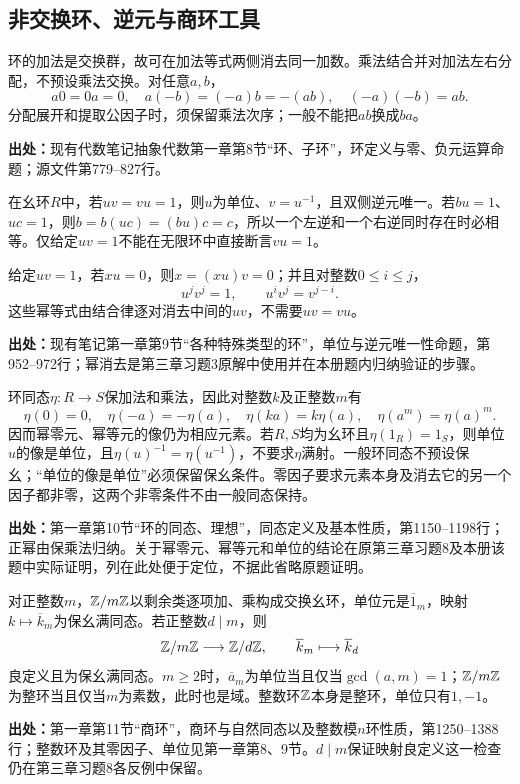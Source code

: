 \subsection{非交换环、逆元与商环工具}

\begin{reviewprop}\label{tool:r-ring-laws}
环的加法是交换群，故可在加法等式两侧消去同一加数。乘法结合并对加法左右分配，不预设乘法交换。对任意$a,b$，
\[
a0=0a=0,\quad a(-b)=(-a)b=-(ab),\quad(-a)(-b)=ab.
\]
分配展开和提取公因子时，须保留乘法次序；一般不能把$ab$换成$ba$。

\textbf{出处：}现有代数笔记抽象代数第一章第8节“环、子环”，环定义与零、负元运算命题；源文件第779--827行。
\end{reviewprop}

\begin{reviewprop}[双侧逆元唯一与左右逆相等]\label{tool:r-unit-laws}
在幺环$R$中，若$uv=vu=1$，则$u$为单位、$v=u^{-1}$，且双侧逆元唯一。若$b u=1$、$u c=1$，则$b=b(uc)=(bu)c=c$，所以一个左逆和一个右逆同时存在时必相等。仅给定$uv=1$不能在无限环中直接断言$vu=1$。

给定$uv=1$，若$xu=0$，则$x=(xu)v=0$；并且对整数$0\le i\le j$，
\[
u^jv^j=1,\qquad u^iv^j=v^{j-i}.
\]
这些幂等式由结合律逐对消去中间的$uv$，不需要$uv=vu$。

\textbf{出处：}现有笔记第一章第9节“各种特殊类型的环”，单位与逆元唯一性命题，第952--972行；幂消去是第三章习题3原解中使用并在本册题内归纳验证的步骤。
\end{reviewprop}

\begin{reviewprop}[环同态保持的等式与单位]\label{tool:r-homomorphism}
环同态$\eta:R\to S$保加法和乘法，因此对整数$k$及正整数$m$有
\[
\eta(0)=0,\quad\eta(-a)=-\eta(a),\quad
\eta(ka)=k\eta(a),\quad\eta(a^m)=\eta(a)^m.
\]
因而幂零元、幂等元的像仍为相应元素。若$R,S$均为幺环且$\eta(1_R)=1_S$，则单位$u$的像是单位，且$\eta(u)^{-1}=\eta(u^{-1})$，不要求$\eta$满射。一般环同态不预设保幺；“单位的像是单位”必须保留保幺条件。零因子要求元素本身及消去它的另一个因子都非零，这两个非零条件不由一般同态保持。

\textbf{出处：}第一章第10节“环的同态、理想”，同态定义及基本性质，第1150--1198行；正幂由保乘法归纳。关于幂零元、幂等元和单位的结论在原第三章习题8及本册该题中实际证明，列在此处便于定位，不据此省略原题证明。
\end{reviewprop}

\begin{reviewprop}[整数商环与自然满同态]\label{tool:r-quotients}
对正整数$m$，$\mathbb Z/m\mathbb Z$以剩余类逐项加、乘构成交换幺环，单位元是$\overline1_m$，映射$k\mapsto\overline k_m$为保幺满同态。若正整数$d\mid m$，则
\[
\mathbb Z/m\mathbb Z\longrightarrow\mathbb Z/d\mathbb Z,\qquad\overline k_m\longmapsto\overline k_d
\]
良定义且为保幺满同态。$m\ge2$时，$\overline a_m$为单位当且仅当$\gcd(a,m)=1$；$\mathbb Z/m\mathbb Z$为整环当且仅当$m$为素数，此时也是域。整数环$\mathbb Z$本身是整环，单位只有$1,-1$。

\textbf{出处：}第一章第11节“商环”，商环与自然同态以及整数模$n$环性质，第1250--1388行；整数环及其零因子、单位见第一章第8、9节。$d\mid m$保证映射良定义这一检查仍在第三章习题8各反例中保留。
\end{reviewprop}

